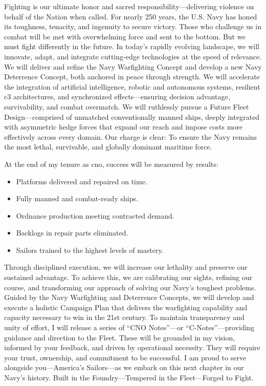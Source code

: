 \documentclass[../main.tex]{subfiles}
\begin{document}
\begin{description}[style=nextline, labelsep=0.5em, font=\bfseries]
\begin{description}[style=nextline, labelsep=0.5em, font=\bfseries]
    \item[\textbf{Fight.}] Fighting is our ultimate honor and sacred responsibility---delivering violence on behalf of the Nation when called. For nearly 250 years, the U.S. Navy has honed its toughness, tenacity, and ingenuity to secure victory. Those who challenge us in combat will be met with overwhelming force and sent to the bottom. But we must fight differently in the future. In today's rapidly evolving landscape, we will innovate, adapt, and integrate cutting-edge technologies at the speed of relevance. We will deliver and refine the Navy Warfighting Concept and develop a new Navy Deterrence Concept, both anchored in peace through strength. We will accelerate the integration of artificial intelligence, robotic and autonomous systems, resilient \ac{c3} architectures, and synchronized effects---ensuring decision advantage, survivability, and combat overmatch. We will ruthlessly pursue a Future Fleet Design---comprised of unmatched conventionally manned ships, deeply integrated with asymmetric hedge forces that expand our reach and impose costs more effectively across every domain. Our charge is clear: To ensure the Navy remains the most lethal, survivable, and globally dominant maritime force.
  \end{description}

  \item[\textbf{Theory of victory.}] At the end of my tenure as \ac{cno}, success will be measured by results:
    \begin{itemize}
      \item Platforms delivered and repaired on time.
      \item Fully manned and combat-ready ships.
      \item Ordnance production meeting contracted demand.
      \item Backlogs in repair parts eliminated.
      \item Sailors trained to the highest levels of mastery.
    \end{itemize}
    Through disciplined execution, we will increase our lethality and preserve our sustained advantage. To achieve this, we are calibrating our sights, refining our course, and transforming our approach of solving our Navy's toughest problems. Guided by the Navy Warfighting and Deterrence Concepts, we will develop and execute a holistic Campaign Plan that delivers the warfighting capability and capacity necessary to win in the 21st century. To maintain transparency and unity of effort, I will release a series of ``CNO Notes''---or ``C-Notes''---providing guidance and direction to the Fleet. These will be grounded in my vision, informed by your feedback, and driven by operational necessity. They will require your trust, ownership, and commitment to be successful. I am proud to serve alongside you---America's Sailors---as we embark on this next chapter in our Navy's history. Built in the Foundry---Tempered in the Fleet---Forged to Fight.


\end{description}
\end{document}
